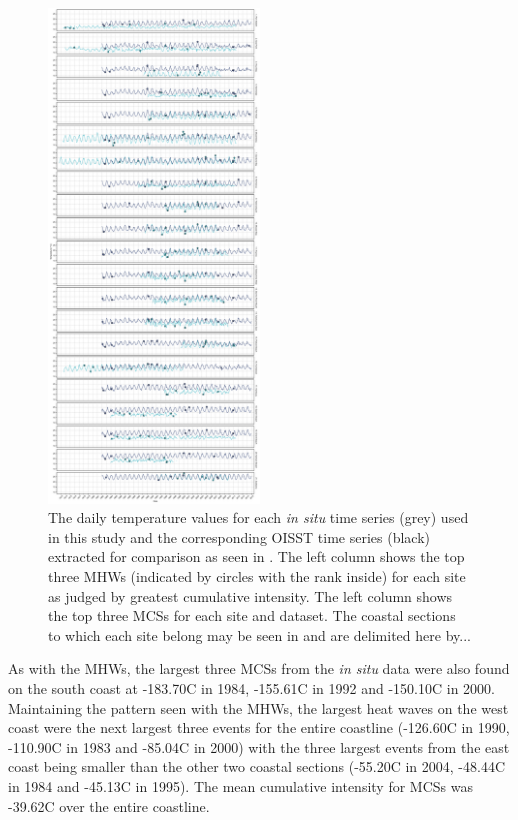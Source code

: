 \documentclass[a4paper,10pt,review]{elsarticle}
\begin{document}
\begin{figure}
\centering \includegraphics[width=0.50\textwidth]{figure2.pdf}
\caption{The daily temperature values for each \emph{in situ} time series (grey) used in this study and the corresponding OISST time series (black) extracted for comparison as seen in . The left column shows the top three MHWs (indicated by circles with the rank inside) for each site as judged by greatest cumulative intensity. The left column shows the top three MCSs for each site and dataset. The coastal sections to which each site belong may be seen in  and are delimited here by...} \label{fig:Figure2}
\end{figure}

As with the MHWs, the largest three MCSs from the \emph{in situ} data were also found on the south coast at -183.70\degree C in 1984, -155.61\degree C in 1992 and -150.10\degree C in 2000. Maintaining the pattern seen with the MHWs, the largest heat waves on the west coast were the next largest three events for the entire coastline (-126.60\degree C in 1990, -110.90\degree C in 1983 and -85.04\degree C in 2000) with the three largest events from the east coast being smaller than the other two coastal sections (-55.20\degree C in 2004, -48.44\degree C in 1984 and -45.13\degree C in 1995). The mean cumulative intensity for MCSs was -39.62\degree C over the entire coastline.
\end{document}
